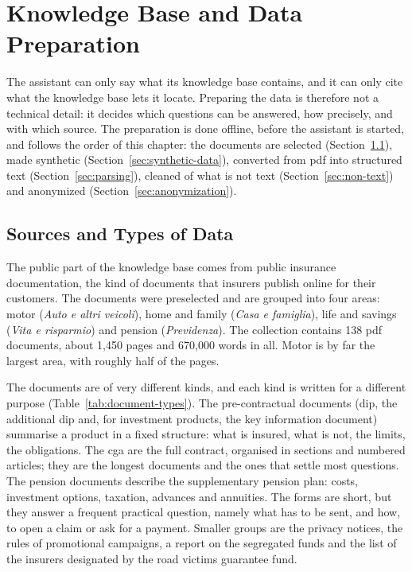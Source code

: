 \chapter{Knowledge Base and Data Preparation}
\label{chap:knowledge-base}

The assistant can only say what its knowledge base contains, and it can only cite what the
knowledge base lets it locate. Preparing the data is therefore not a technical detail: it decides
which questions can be answered, how precisely, and with which source. The preparation is done
offline, before the assistant is started, and follows the order of this chapter: the documents
are selected (Section~\ref{sec:knowledge-base}), made synthetic (Section~\ref{sec:synthetic-data}),
converted from \ac{pdf} into structured text (Section~\ref{sec:parsing}), cleaned of what is not
text (Section~\ref{sec:non-text}) and anonymized (Section~\ref{sec:anonymization}).

\section{Sources and Types of Data}
\label{sec:knowledge-base}

The public part of the knowledge base comes from public insurance documentation, the kind of
documents that insurers publish online for their customers. The documents were preselected and are
grouped into four areas: motor (\textit{Auto e altri veicoli}), home and family (\textit{Casa e
famiglia}), life and savings (\textit{Vita e risparmio}) and pension (\textit{Previdenza}). The
collection contains 138 \ac{pdf} documents, about 1{,}450 pages and 670{,}000 words in all. Motor
is by far the largest area, with roughly half of the pages.

The documents are of very different kinds, and each kind is written for a different purpose
(Table~\ref{tab:document-types}). The pre-contractual documents (\ac{dip}, the additional \ac{dip}
and, for investment products, the key information document) summarise a product in a fixed
structure: what is insured, what is not, the limits, the obligations. The \ac{cga} are the full
contract, organised in sections and numbered articles; they are the longest documents and the ones
that settle most questions. The pension documents describe the supplementary pension plan: costs,
investment options, taxation, advances and annuities. The forms are short, but they answer a
frequent practical question, namely what has to be sent, and how, to open a claim or ask for a
payment. Smaller groups are the privacy notices, the rules of promotional campaigns, a report on
the segregated funds and the list of the insurers designated by the road victims guarantee fund.

